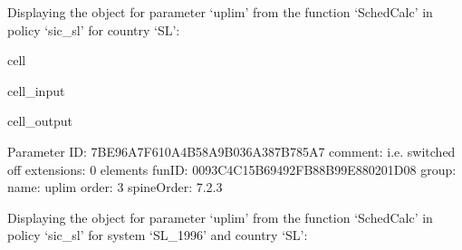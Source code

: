\documentclass[letterpaper,10pt,english]{sphinxmanual}
\begin{document}
\sphinxAtStartPar
Displaying the  object for parameter ‘uplim’ from the function ‘SchedCalc’ in policy ‘sic\_sl’ for country ‘SL’:

\begin{sphinxuseclass}{cell}
\begin{sphinxuseclass}{cell_input}
\begin{sphinxVerbatim}[commandchars=\\\{\}]
\PYG{p}{[}\PYG{p}{]}\PYG{p}{[}\PYG{p}{]}\PYG{p}{[}\PYG{p}{]}\PYG{p}{[}\PYG{p}{]}
\end{sphinxVerbatim}

\end{sphinxuseclass}
\begin{sphinxuseclass}{cell_output}
\begin{sphinxVerbatim}[commandchars=\\\{\}]
\PYGZhy{}\PYGZhy{}\PYGZhy{}\PYGZhy{}\PYGZhy{}\PYGZhy{}\PYGZhy{}\PYGZhy{}\PYGZhy{}\PYGZhy{}\PYGZhy{}\PYGZhy{}\PYGZhy{}\PYGZhy{}\PYGZhy{}\PYGZhy{}\PYGZhy{}\PYGZhy{}\PYGZhy{}\PYGZhy{}\PYGZhy{}\PYGZhy{}\PYGZhy{}\PYGZhy{}\PYGZhy{}\PYGZhy{}\PYGZhy{}\PYGZhy{}\PYGZhy{}\PYGZhy{}
Parameter
\PYGZhy{}\PYGZhy{}\PYGZhy{}\PYGZhy{}\PYGZhy{}\PYGZhy{}\PYGZhy{}\PYGZhy{}\PYGZhy{}\PYGZhy{}\PYGZhy{}\PYGZhy{}\PYGZhy{}\PYGZhy{}\PYGZhy{}\PYGZhy{}\PYGZhy{}\PYGZhy{}\PYGZhy{}\PYGZhy{}\PYGZhy{}\PYGZhy{}\PYGZhy{}\PYGZhy{}\PYGZhy{}\PYGZhy{}\PYGZhy{}\PYGZhy{}\PYGZhy{}\PYGZhy{}
	 ID: \PYGZsq{}7BE96A7F\PYGZhy{}610A\PYGZhy{}4B58\PYGZhy{}A9B0\PYGZhy{}36A387B785A7\PYGZsq{}
	 comment: \PYGZsq{}i.e. switched off\PYGZsq{}
	 extensions: 0 elements
	 funID: \PYGZsq{}0093C4C1\PYGZhy{}5B69\PYGZhy{}492F\PYGZhy{}B88B\PYGZhy{}99E880201D08\PYGZsq{}
	 group: \PYGZsq{}\PYGZsq{}
	 name: \PYGZsq{}uplim\PYGZsq{}
	 order: \PYGZsq{}3\PYGZsq{}
	 spineOrder: \PYGZsq{}7.2.3\PYGZsq{}
\end{sphinxVerbatim}

\end{sphinxuseclass}
\end{sphinxuseclass}
\sphinxAtStartPar
Displaying the  object for parameter ‘uplim’ from the function ‘SchedCalc’ in policy ‘sic\_sl’ for system ‘SL\_1996’ and country ‘SL’:
\end{document}
